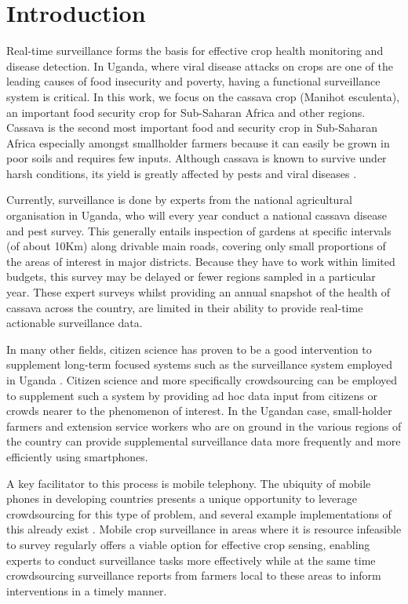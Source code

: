 \documentclass[letterpaper]{article} %
\begin{document}
\section{Introduction}
Real-time surveillance forms the basis for effective crop health monitoring and disease detection. In Uganda, where viral disease attacks on crops are one of the leading causes of food insecurity and poverty, having a functional surveillance system is critical. In this work, we focus on the cassava crop (Manihot esculenta), an important food security crop for Sub-Saharan Africa and other regions. Cassava is the second most important food and security crop in Sub-Saharan Africa especially amongst smallholder farmers because it can easily be grown in poor soils and requires few inputs. Although cassava is known to survive under harsh conditions, its yield is greatly affected by pests and viral diseases \cite{ephraim2015,otim2000current}. 


Currently, surveillance is done by experts from the national agricultural organisation in Uganda, who will every year conduct a national cassava disease and pest survey. This generally entails inspection of gardens at specific intervals (of about 10Km) along drivable main roads, covering only small proportions of the areas of interest in major districts. Because they have to work within limited budgets, this survey may be delayed or fewer regions sampled in a particular year. These expert surveys whilst providing an annual snapshot of the health of cassava across the country, are limited in their ability to provide real-time actionable surveillance data. 

In many other fields, citizen science has proven to be a good intervention to supplement long-term focused systems such as the surveillance system employed in Uganda \cite{silvertown2009new}. Citizen science and more specifically crowdsourcing can be employed to supplement such a system by providing ad hoc data input from citizens or crowds nearer to the phenomenon of interest. In the Ugandan case, small-holder farmers and extension service workers who are on ground in the various regions of the country can provide supplemental surveillance data more frequently and more efficiently using smartphones.

A key facilitator to this process is mobile telephony. The ubiquity of mobile phones in developing countries presents a unique opportunity to leverage crowdsourcing for this type of problem, and several example implementations of this already exist \cite{chatzimilioudis2012crowdsourcing,agapie2015crowdsourcing}. Mobile crop surveillance in areas where it is resource infeasible to survey regularly offers a viable option for effective crop sensing, enabling experts to conduct surveillance tasks more effectively while at the same time crowdsourcing surveillance reports from farmers local to these areas to inform interventions in a timely manner.
\end{document}
